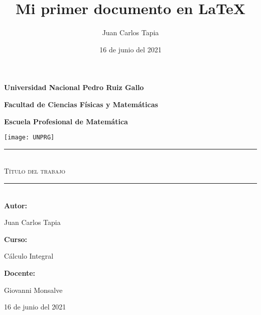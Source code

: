 \documentclass{article}
\title{Mi primer documento en \LaTeX}
\author{Juan Carlos Tapia}
\date{16 de junio del 2021}
\begin{document}
\begin{titlepage}
\begin{center}
{\bf \LARGE  Universidad Nacional Pedro Ruiz Gallo}\par
\vspace{2mm}
{\bf \Large Facultad de Ciencias Físicas y Matemáticas}\par
\vspace{2mm}
{\bf \large Escuela Profesional de Matemática}\par
\vspace{1cm}
\texttt{[image: UNPRG]}\par
\vspace{1cm}
{\rule{\linewidth}{0.50mm}}\\
\vspace{3mm}
{\scshape \huge Título del trabajo}\\
\vspace{3mm}
{\rule{\linewidth}{0.50mm}}\\
\vspace{1cm}
{\bf \Large Autor:}\par
\vspace{2mm}
{\Large Juan Carlos Tapia}\par
\vspace{1cm}
{\bf \Large Curso:}\par
\vspace{2mm}
{\Large Cálculo Integral}\par
\vspace{1cm}
{\bf \Large Docente:}\par
\vspace{2mm}
{\Large Giovanni Monsalve}\par
\vspace{1cm}
{\Large 16 de junio del 2021}
\end{center}
\end{titlepage}
\end{document}
